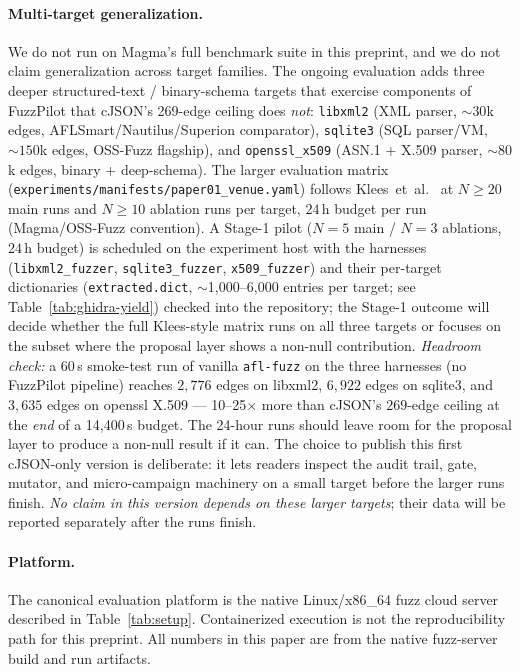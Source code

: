 \documentclass[11pt]{article}
\begin{document}
\paragraph{Multi-target generalization.}
We do not run on Magma's full benchmark suite in this preprint, and
we do not claim generalization across target families. The ongoing
evaluation adds three deeper structured-text / binary-schema targets that
exercise components of FuzzPilot that cJSON's 269-edge ceiling does
\emph{not}: \texttt{libxml2} (XML parser, ${\sim}30$k edges,
AFLSmart/Nautilus/Superion comparator), \texttt{sqlite3}
(SQL parser/VM, ${\sim}150$k edges, OSS-Fuzz flagship), and
\texttt{openssl\_x509} (ASN.1 + X.509 parser, ${\sim}80$k edges,
binary + deep-schema). The larger evaluation matrix
(\texttt{experiments/manifests/paper01\_venue.yaml}) follows
Klees~et~al.~\cite{klees2018evaluating} at $N{\geq}20$ main runs
and $N{\geq}10$ ablation runs per target, $24$\,h budget per run
(Magma/OSS-Fuzz convention). A Stage-1 pilot
($N{=}5$ main / $N{=}3$ ablations, $24$\,h budget) is scheduled
on the experiment host with the harnesses
(\texttt{libxml2\_fuzzer}, \texttt{sqlite3\_fuzzer},
\texttt{x509\_fuzzer}) and their per-target dictionaries
(\texttt{extracted.dict}, $\sim$1{,}000--6{,}000 entries per
target; see Table~\ref{tab:ghidra-yield}) checked into the
repository; the Stage-1 outcome will decide whether
the full Klees-style matrix runs on all three targets or
focuses on the subset where the proposal layer shows a
non-null contribution. \emph{Headroom check:} a $60$\,s smoke-test
run of vanilla \texttt{afl-fuzz} on the three harnesses (no
FuzzPilot pipeline) reaches $2{,}776$ edges on libxml2,
$6{,}922$ edges on sqlite3, and $3{,}635$ edges on openssl X.509
--- 10--25$\times$ more than cJSON's $269$-edge ceiling at the
\emph{end} of a 14{,}400\,s budget. The 24-hour runs should leave
room for the proposal layer to produce a non-null result if it can.
The choice to publish this first cJSON-only version is deliberate: it
lets readers inspect the audit trail, gate, mutator, and
micro-campaign machinery on a small target before the larger runs
finish.
\emph{No claim in this version depends on these larger targets};
their data will be reported separately after the runs finish.

\paragraph{Platform.}
The canonical evaluation platform is the native Linux/x86\_64 fuzz
cloud server described in Table~\ref{tab:setup}. Containerized
execution is not the reproducibility path for this preprint. All
numbers in this paper are from the native fuzz-server build and run
artifacts.
\end{document}
